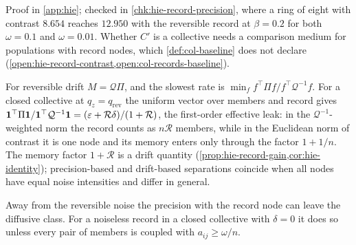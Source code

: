 Proof in \cref{app:hie}; checked in \cref{chk:hie-record-precision}, where a ring of eight with contrast $8.654$ reaches $12.950$ with the reversible record at $\beta=0.2$ for both $\omega=0.1$ and $\omega=0.01$. Whether $C'$ is a collective needs a comparison medium for populations with record nodes, which \cref{def:col-baseline} does not declare (\cref{open:hie-record-contrast,open:col-records-baseline}).

\begin{remark}\label{rem:hie-memory-absent}
For reversible drift $M=\mathcal Q\Pi$, and the slowest rate is $\min_ff^\top\Pi f/f^\top\mathcal Q^{-1}f$. For a closed collective at $q_z=q_{\mathrm{rev}}$ the uniform vector over members and record gives $\mathbf{1}^\top\Pi\mathbf{1}/\mathbf{1}^\top\mathcal Q^{-1}\mathbf{1}=(\varepsilon+\mathcal R\delta)/(1+\mathcal R)$, the first-order effective leak: in the $\mathcal Q^{-1}$-weighted norm the record counts as $n\mathcal R$ members, while in the Euclidean norm of contrast it is one node and its memory enters only through the factor $1+1/n$. The memory factor $1+\mathcal R$ is a drift quantity (\cref{prop:hie-record-gain,cor:hie-identity}); precision-based and drift-based separations coincide when all nodes have equal noise intensities and differ in general.
\end{remark}

Away from the reversible noise the precision with the record node can leave the diffusive class. For a noiseless record in a closed collective with $\delta=0$ it does so unless every pair of members is coupled with $a_{ij}\ge\omega/n$.

